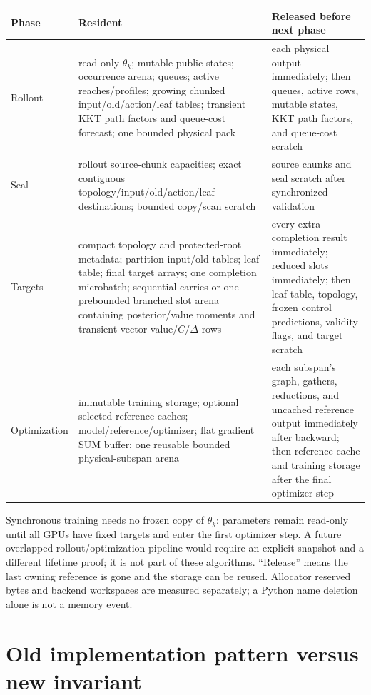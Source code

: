 \documentclass[10pt,a4paper]{article}
\begin{document}
\begin{longtable}{p{}p{}p{}}
\toprule
Phase & Resident & Released before next phase \\
\midrule
\endhead
Rollout & read-only $\theta_k$; mutable public states; occurrence arena; queues; active reaches/profiles; growing chunked input/old/action/leaf tables; transient KKT path factors and queue-cost forecast; one bounded physical pack & each physical output immediately; then queues, active rows, mutable states, KKT path factors, and queue-cost scratch \\
Seal & rollout source-chunk capacities; exact contiguous topology/input/old/action/leaf destinations; bounded copy/scan scratch & source chunks and seal scratch after synchronized validation \\
Targets & compact topology and protected-root metadata; partition input/old tables; leaf table; final target arrays; one completion microbatch; sequential carries or one prebounded branched slot arena containing posterior/value moments and transient vector-value/$C/\Delta$ rows & every extra completion result immediately; reduced slots immediately; then leaf table, topology, frozen control predictions, validity flags, and target scratch \\
Optimization & immutable training storage; optional selected reference caches; model/reference/optimizer; flat gradient SUM buffer; one reusable bounded physical-subspan arena & each subspan's graph, gathers, reductions, and uncached reference output immediately after backward; then reference cache and training storage after the final optimizer step \\
\bottomrule
\end{longtable}

Synchronous training needs no frozen copy of $\theta_k$: parameters remain
read-only until all GPUs have fixed targets and enter the first optimizer step.
A future overlapped rollout/optimization pipeline would require an explicit
snapshot and a different lifetime proof; it is not part of these algorithms.
``Release'' means the last owning reference is gone and the storage can be
reused.  Allocator reserved bytes and backend workspaces are measured
separately; a Python name deletion alone is not a memory event.

\section{Old implementation pattern versus new invariant}
\end{document}
